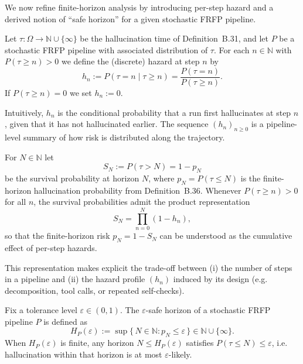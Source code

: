 We now refine finite-horizon analysis by introducing per-step hazard and a derived notion of
``safe horizon'' for a given stochastic FRFP pipeline.

\begin{definition}\label{def:hazard}
Let $\tau : \Omega \to \mathbb{N} \cup \{\infty\}$ be the hallucination time of Definition~B.31,
and let $P$ be a stochastic FRFP pipeline with associated distribution of $\tau$.
For each $n \in \mathbb{N}$ with $P(\tau \ge n) > 0$ we define the (discrete) hazard at step $n$ by
\[
  h_n := P(\tau = n \mid \tau \ge n)
       = \frac{P(\tau = n)}{P(\tau \ge n)}.
\]
If $P(\tau \ge n) = 0$ we set $h_n := 0$.
\end{definition}

Intuitively, $h_n$ is the conditional probability that a run first hallucinates at step $n$,
given that it has not hallucinated earlier. The sequence $(h_n)_{n \ge 0}$ is a pipeline-level
summary of how risk is distributed along the trajectory.

\begin{definition}\label{def:survival}
For $N \in \mathbb{N}$ let
\[
  S_N := P(\tau > N) = 1 - p_N
\]
be the survival probability at horizon $N$, where $p_N = P(\tau \le N)$ is the finite-horizon
hallucination probability from Definition~B.36. Whenever $P(\tau \ge n) > 0$ for all $n$,
the survival probabilities admit the product representation
\[
  S_N = \prod_{n=0}^{N} (1 - h_n),
\]
so that the finite-horizon risk $p_N = 1 - S_N$ can be understood as the cumulative effect
of per-step hazards.
\end{definition}

This representation makes explicit the trade-off between (i) the number of steps in a pipeline
and (ii) the hazard profile $(h_n)$ induced by its design (e.g. decomposition, tool calls,
or repeated self-checks).

\begin{definition}\label{def:safe-horizon}
Fix a tolerance level $\varepsilon \in (0,1)$. The $\varepsilon$-safe horizon of a stochastic
FRFP pipeline $P$ is defined as
\[
  H_P(\varepsilon)
  := \sup\{\,N \in \mathbb{N} : p_N \le \varepsilon\,\}
  \in \mathbb{N} \cup \{\infty\}.
\]
When $H_P(\varepsilon)$ is finite, any horizon $N \le H_P(\varepsilon)$ satisfies
$P(\tau \le N) \le \varepsilon$, i.e. hallucination within that horizon is at most
$\varepsilon$-likely.
\end{definition}

